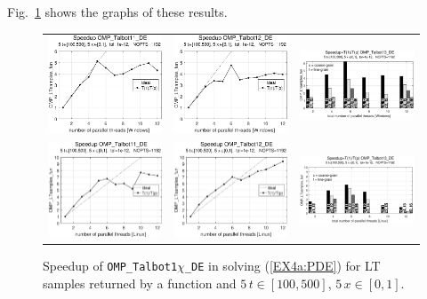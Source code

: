 \documentclass[a4paper,10pt]{report}%
\begin{document}
Fig.~\ref{PAR_EX4a_speedup_fun} shows the graphs of these results.
\begin{figure}[htb]
\centering
\begin{tabular}{ccc} %
\includegraphics[height=0.2\textwidth]{./FIGS/EX4a/EX4a_fun_speedup_11_5t_100_Windows.eps} &
\includegraphics[height=0.2\textwidth]{./FIGS/EX4a/EX4a_fun_speedup_12_5t_100_Windows.eps} &
\includegraphics[height=0.2\textwidth,keepaspectratio=true]{./FIGS/EX4a/EX4a_fun_speedup_13_5t_100_Windows.eps} \\
\includegraphics[height=0.2\textwidth]{./FIGS/EX4a/EX4a_fun_speedup_11_5t_100_Linux.eps} &
\includegraphics[height=0.2\textwidth]{./FIGS/EX4a/EX4a_fun_speedup_12_5t_100_Linux.eps} &
\includegraphics[height=0.2\textwidth,keepaspectratio=true]{./FIGS/EX4a/EX4a_fun_speedup_13_5t_100_Linux.eps}
\end{tabular}
\caption{\small Speedup of {\tt OMP\_Talbot1$\chi$\_DE} in solving (\ref{EX4a:PDE}) for LT samples
returned by a function and $5\,t\in[100,500]$, $5\,x\in[0,1]$.}
\label{PAR_EX4a_speedup_fun}
\end{figure}
\end{document}
